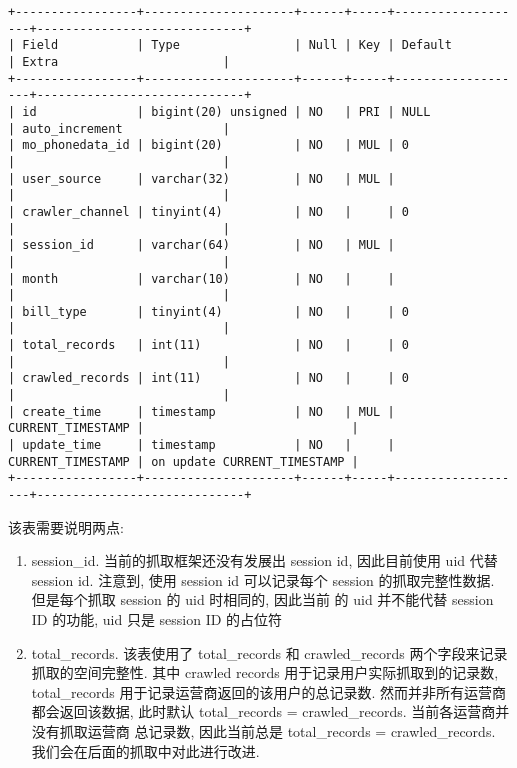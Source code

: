 \documentclass[UTF8, heading=true, schema=chinese]{ctexart}
\begin{document}
\begin{verbatim}
+-----------------+---------------------+------+-----+-------------------+-----------------------------+
| Field           | Type                | Null | Key | Default           | Extra                       |
+-----------------+---------------------+------+-----+-------------------+-----------------------------+
| id              | bigint(20) unsigned | NO   | PRI | NULL              | auto_increment              |
| mo_phonedata_id | bigint(20)          | NO   | MUL | 0                 |                             |
| user_source     | varchar(32)         | NO   | MUL |                   |                             |
| crawler_channel | tinyint(4)          | NO   |     | 0                 |                             |
| session_id      | varchar(64)         | NO   | MUL |                   |                             |
| month           | varchar(10)         | NO   |     |                   |                             |
| bill_type       | tinyint(4)          | NO   |     | 0                 |                             |
| total_records   | int(11)             | NO   |     | 0                 |                             |
| crawled_records | int(11)             | NO   |     | 0                 |                             |
| create_time     | timestamp           | NO   | MUL | CURRENT_TIMESTAMP |                             |
| update_time     | timestamp           | NO   |     | CURRENT_TIMESTAMP | on update CURRENT_TIMESTAMP |
+-----------------+---------------------+------+-----+-------------------+-----------------------------+
\end{verbatim}

该表需要说明两点:
\begin{enumerate}
	\item session_id. 当前的抓取框架还没有发展出 session id, 因此目前使用 uid 代替 session id. 注意到,
使用 session id 可以记录每个 session 的抓取完整性数据. 但是每个抓取 session 的 uid 时相同的, 因此当前
的 uid 并不能代替 session ID 的功能, uid 只是 session ID 的占位符

	\item total_records. 该表使用了 total_records 和 crawled_records 两个字段来记录抓取的空间完整性. 
其中 crawled records 用于记录用户实际抓取到的记录数, total_records 用于记录运营商返回的该用户的总记录数.
然而并非所有运营商都会返回该数据, 此时默认 total_records = crawled_records. 当前各运营商并没有抓取运营商
总记录数, 因此当前总是 total_records = crawled_records. 我们会在后面的抓取中对此进行改进.
\end{enumerate}
\end{document}
